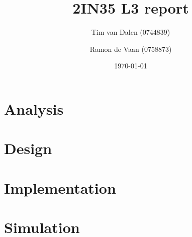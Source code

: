 \documentclass[a4paper,11pt]{article}
\title{
	2IN35 L3 report
}
\author{
	Tim van Dalen (0744839)
	\and
	Ramon de Vaan (0758873)
}
\date{\today}
\begin{document}
	\maketitle

	\section{Analysis}
	

	\section{Design}
	

	\section{Implementation}
	

	\section{Simulation}
	
\end{document}
